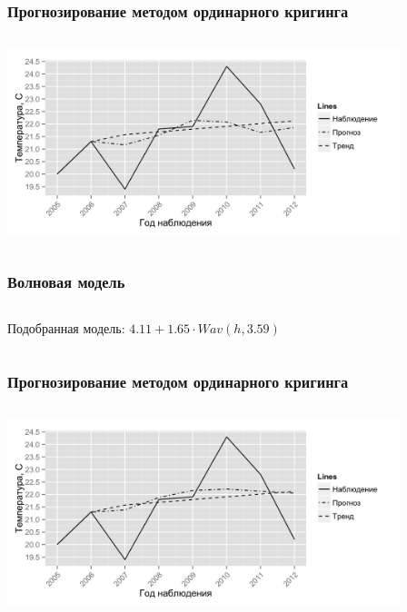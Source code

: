 \documentclass[10pt, ucs, pdf,aspectratio=169]{beamer}
\begin{document}
\begin{frame}
  \frametitle{Прогнозирование методом ординарного кригинга}   %
   \begin{columns}[c]
   \column{4.5in}
   \includegraphics[width=4.5in]{../../figures/variogram/auto-class-18-cross-prediction.png}
  \end{columns}
\end{frame}

\begin{frame}
  \frametitle{Волновая модель}   %
  \begin{columns}[c]
  \column{2in}  %
  Подобранная модель: $ 4.11 + 1.65 \cdot Wav(h, 3.59) $
  \column{3in}
  \end{columns}
\end{frame}

\begin{frame}
  \frametitle{Прогнозирование методом ординарного кригинга}   %
   \begin{columns}[c]
   \column{4.5in}
   \includegraphics[width=4.5in]{../../figures/variogram/auto-rob-5-cross-prediction.png}
  \end{columns}
\end{frame}

\end{document}
